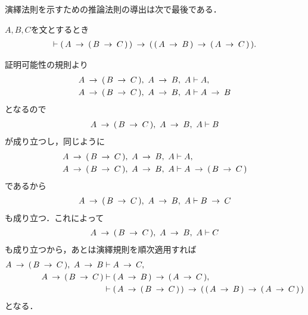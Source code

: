 	演繹法則を示すための推論法則の導出は次で最後である．
	
	\begin{screen}
		\begin{logicalthm}[含意の分配則]
		\label{logicalthm:distributive_law_of_implication}
			$A,B,C$を文とするとき
			\begin{align}
				\vdash (\, A \rarrow (\, B \rarrow C\, )\, ) 
				\rarrow (\, (\, A \rarrow B\, ) \rarrow (\, A \rarrow C\, )\, ).
			\end{align}
		\end{logicalthm}
	\end{screen}
	
	\begin{prf}
		証明可能性の規則より
		\begin{align}
			A \rarrow (\, B \rarrow C\, ),\ A \rarrow B,\ A
			&\vdash A, \\
			A \rarrow (\, B \rarrow C\, ),\ A \rarrow B,\ A
			&\vdash A \rarrow B
		\end{align}
		となるので
		\begin{align}
			A \rarrow (\, B \rarrow C\, ),\ A \rarrow B,\ A
			\vdash B
		\end{align}
		が成り立つし，同じように
		\begin{align}
			A \rarrow (\, B \rarrow C\, ),\ A \rarrow B,\ A
			&\vdash A, \\
			A \rarrow (\, B \rarrow C\, ),\ A \rarrow B,\ A
			&\vdash A \rarrow (\, B \rarrow C\, )
		\end{align}
		であるから
		\begin{align}
			A \rarrow (\, B \rarrow C\, ),\ A \rarrow B,\ A
			\vdash B \rarrow C
		\end{align}
		も成り立つ．これによって
		\begin{align}
			A \rarrow (\, B \rarrow C\, ),\ A \rarrow B,\ A \vdash C
		\end{align}
		も成り立つから，あとは演繹規則を順次適用すれば
		\begin{align}
			A \rarrow (\, B \rarrow C\, ),\ A \rarrow B
			&\vdash A \rarrow C, \\
			A \rarrow (\, B \rarrow C\, )
			&\vdash (\, A \rarrow B\, ) \rarrow (\, A \rarrow C\, ), \\
			&\vdash (\, A \rarrow (\, B \rarrow C\, )\, ) 
				\rarrow (\, (\, A \rarrow B\, ) \rarrow (\, A \rarrow C\, )\, )
		\end{align}
		となる．
		\QED
	\end{prf}
	
